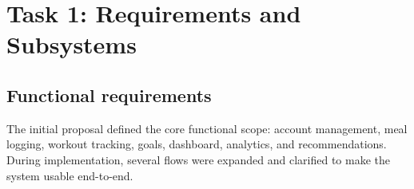 \documentclass[11pt]{article}
\begin{document}
\section{Task 1: Requirements and Subsystems}

\subsection{Functional requirements}

The initial proposal defined the core functional scope: account management, meal logging, workout tracking, goals, dashboard, analytics, and recommendations.
During implementation, several flows were expanded and clarified to make the system usable end-to-end.
\end{document}
